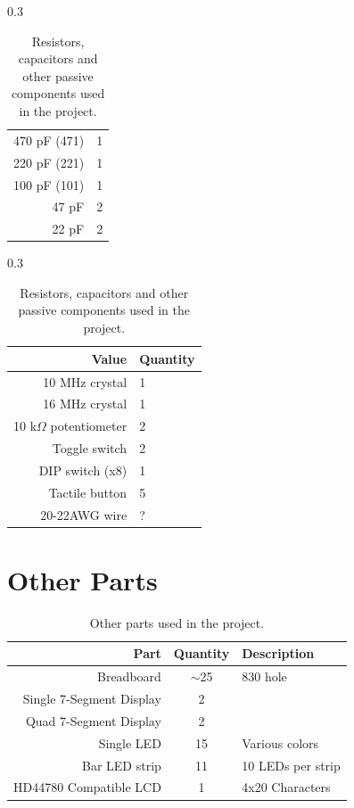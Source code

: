 \begin{table}[H]
\begin{subtable}[t]{0.3\textwidth}
\begin{tabular}{r|l}
      470 pF (471)             & 1 \\
      220 pF (221)             & 1 \\
      100 pF (101)             & 1 \\    
      47 pF                    & 2  \\    
      22 pF                    & 2  \\    
    \end{tabular}
    \caption{Capacitors}
  \end{subtable}
  \hfill
  \begin{subtable}[t]{0.3\textwidth}
    \vspace{0pt}
    \begin{tabular}{r|l}
      Value                      & Quantity \\ \hline
      10 MHz crystal             & 1 \\    
      16 MHz crystal             & 1 \\
      10 k$\Omega$ potentiometer & 2 \\
      Toggle switch              & 2 \\
      DIP switch (x8)            & 1 \\
      Tactile button             & 5 \\
      20-22AWG wire              & ? \\
    \end{tabular}
    \caption{Other passive components}
  \end{subtable}

  \caption{Resistors, capacitors and other passive components used in the project.}
  \label{tab:rcbom}
\end{table}


\section{Other Parts}
\begin{table}[H]
  \centering
  \begin{tabular}{r|c|l}
    Part                     & Quantity & Description \\\hline
    Breadboard               & $\sim$25 & 830 hole  \\
    Single 7-Segment Display & 2 &    \\
    Quad 7-Segment Display   & 2 &    \\
    Single LED               & 15& Various colors \\
    Bar LED strip            & 11& 10 LEDs per strip  \\
    HD44780 Compatible LCD   & 1 & 4x20 Characters  \\
  \end{tabular}
  \caption{Other parts used in the project.}
  \label{tab:parts}
\end{table}

